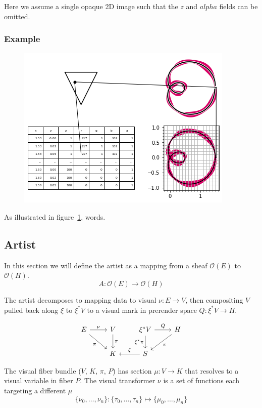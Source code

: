 \documentclass[../main.tex]{subfiles}
\begin{document}
Here we assume a single opaque 2D image such that the $z$ and $alpha$ fields can be omitted. 

\subsubsection{{Example}}
\begin{figure}[H]
    \includegraphics[width=.4\linewidth]{figures/sections/math/render.png}
    \caption{}
    \label{fig:render}
\end{figure}

As illustrated in figure~\ref{fig:render}, words.

\subsection{Artist}

In this section we will define the artist as a mapping from a sheaf $\mathcal{O}(E)$  to $\mathcal{O}(H)$. 
\begin{equation}
    A: \mathcal{O}(E) \rightarrow \mathcal{O}(H)
\end{equation}

The artist decomposes to mapping data to visual $\nu:E\rightarrow V$, then  compositing $V$ pulled back along $\xi$ to $\xi^*V$ to a visual mark in prerender space $Q:\xi^*V\rightarrow H$. 

\begin{equation}
    \label{eq:artist}
\begin{tikzcd}
    E \arrow[r, "\nu"] \arrow[rd, "\pi"'] & V \arrow[d, "\pi"] & \xi^*V \arrow[r, "Q"] \arrow[d, "\xi^*\pi"'] & H \arrow[ld, "\pi"] \\
                                          & K                  & S \arrow[l, "\xi"']                          &                    
\end{tikzcd}
\end{equation}

The visual fiber bundle ($V$, $K$, $\pi$, $P$) has section $\mu: V \rightarrow K$ that resolves to a visual variable \cite{bertinIIPropertiesGraphic2011,munznerMarksChannels} in fiber $P$. The visual transformer $\nu$ is a set of functions each targeting a different $\mu$
\begin{equation}
    \label{eq:nu_expanded}
    \{\nu_{0}, \ldots, \nu_{n}\}: \{\tau_{0}, \ldots, \tau_{n}\} \mapsto \{\mu_{0}, \ldots, \mu_{n}\}
\end{equation}
\end{document}
